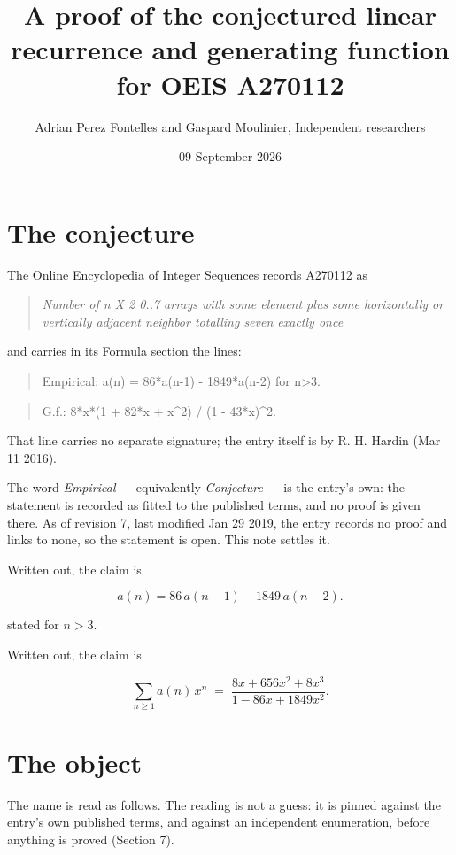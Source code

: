 \documentclass[11pt]{article}
\title{A proof of the conjectured linear recurrence and generating function for OEIS A270112}
\author{Adrian Perez Fontelles and Gaspard Moulinier, Independent researchers}
\date{09 September 2026}
\theoremstyle{definition}
\begin{document}
\maketitle
\section{The conjecture}

The Online Encyclopedia of Integer Sequences records \href{https://oeis.org/A270112}{A270112} as

\begin{quote}\itshape Number of n X 2 0..7 arrays with some element plus some horizontally or vertically adjacent neighbor totalling seven exactly once\end{quote}

and carries in its Formula section the lines:

\begin{quote}\ttfamily Empirical: a(n) = 86*a(n-1) - 1849*a(n-2) for n>3.\end{quote}

\begin{quote}\ttfamily G.f.: 8*x*(1 + 82*x + x\textasciicircum{}2) / (1 - 43*x)\textasciicircum{}2.\end{quote}

That line carries no separate signature; the entry itself is by R. H. Hardin (Mar 11 2016).

The word {\itshape Empirical} --- equivalently {\itshape Conjecture} --- is the entry's own: the statement is recorded as fitted to the published terms, and no proof is given there. As of revision 7, last modified Jan 29 2019, the entry records no proof and links to none, so the statement is open. This note settles it.

Written out, the claim is

\[a(n) = 86\,a(n-1) - 1849\,a(n-2).\]

stated for $n > 3$.

Written out, the claim is

\[\sum_{n \ge 1} a(n)\,x^n \;=\; \frac{8x + 656x^{2} + 8x^{3}}{1 - 86x + 1849x^{2}}.\]

\section{The object}

The name is read as follows. The reading is not a guess: it is pinned against the entry's own published terms, and against an independent enumeration, before anything is proved (Section 7).
\end{document}

